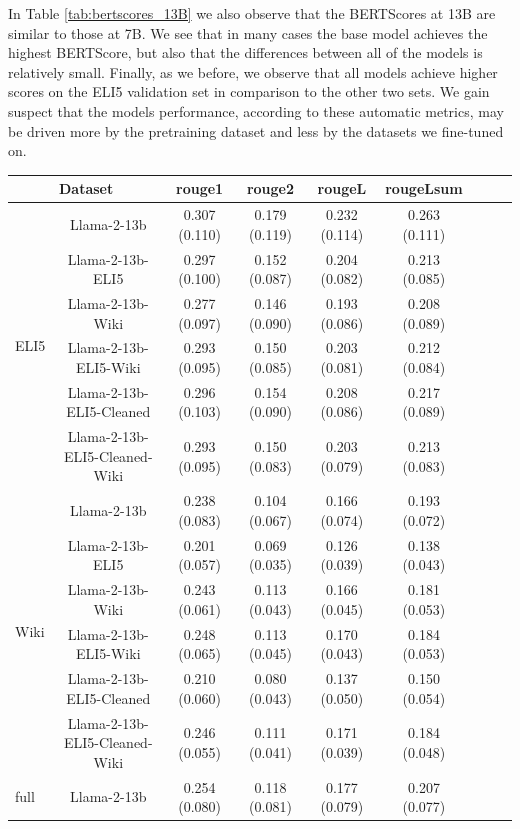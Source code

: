 \documentclass[11pt, oneside]{article}   	%
\begin{document}
In Table \ref{tab:bertscores_13B} we also observe that the BERTScores at 13B are similar to those at 7B. 
We see that in many cases the base model achieves the highest BERTScore, but also that the differences between all of the models is relatively small.
Finally, as we before, we observe that all models achieve higher scores on the ELI5 validation set in comparison to the other two sets.
We gain suspect that the models performance, according to these automatic metrics, may be driven more by the pretraining dataset and less by the datasets we fine-tuned on.

\begin{table}[ht]
\centering
\begin{tabular}{lcccccccc}
\toprule
\multicolumn{2}{c}{Dataset} & \multicolumn{1}{c}{rouge1} & \multicolumn{1}{c}{rouge2} & \multicolumn{1}{c}{rougeL} & \multicolumn{1}{c}{rougeLsum} \\
\midrule
\multirow{6}{*}{ELI5} & Llama-2-13b & 0.307 (0.110) & 0.179 (0.119) & 0.232 (0.114) & 0.263 (0.111) \\
& Llama-2-13b-ELI5 & 0.297 (0.100) & 0.152 (0.087) & 0.204 (0.082) & 0.213 (0.085) \\
& Llama-2-13b-Wiki & 0.277 (0.097) & 0.146 (0.090) & 0.193 (0.086) & 0.208 (0.089) \\
& Llama-2-13b-ELI5-Wiki & 0.293 (0.095) & 0.150 (0.085) & 0.203 (0.081) & 0.212 (0.084) \\
& Llama-2-13b-ELI5-Cleaned & 0.296 (0.103) & 0.154 (0.090) & 0.208 (0.086) & 0.217 (0.089) \\
& Llama-2-13b-ELI5-Cleaned-Wiki & 0.293 (0.095) & 0.150 (0.083) & 0.203 (0.079) & 0.213 (0.083) \\
\midrule
\multirow{6}{*}{Wiki} & Llama-2-13b & 0.238 (0.083) & 0.104 (0.067) & 0.166 (0.074) & 0.193 (0.072) \\
& Llama-2-13b-ELI5 & 0.201 (0.057) & 0.069 (0.035) & 0.126 (0.039) & 0.138 (0.043) \\
& Llama-2-13b-Wiki & 0.243 (0.061) & 0.113 (0.043) & 0.166 (0.045) & 0.181 (0.053) \\
& Llama-2-13b-ELI5-Wiki & 0.248 (0.065) & 0.113 (0.045) & 0.170 (0.043) & 0.184 (0.053) \\
& Llama-2-13b-ELI5-Cleaned & 0.210 (0.060) & 0.080 (0.043) & 0.137 (0.050) & 0.150 (0.054) \\
& Llama-2-13b-ELI5-Cleaned-Wiki & 0.246 (0.055) & 0.111 (0.041) & 0.171 (0.039) & 0.184 (0.048) \\
\midrule
\multirow{6}{*}{full} & Llama-2-13b & 0.254 (0.080) & 0.118 (0.081) & 0.177 (0.079) & 0.207 (0.077) \\

\end{tabular}
\end{table}
\end{document}
